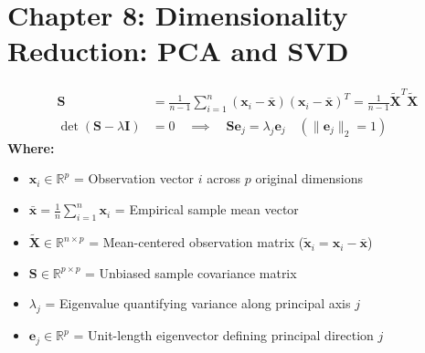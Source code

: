 \section*{Chapter 8: Dimensionality Reduction: PCA and SVD}

\begin{formulabox}
\begin{align*}
    \mathbf{S} &= \frac{1}{n - 1} \sum_{i=1}^n (\mathbf{x}_i - \bar{\mathbf{x}})(\mathbf{x}_i - \bar{\mathbf{x}})^T = \frac{1}{n - 1} \tilde{\mathbf{X}}^T \tilde{\mathbf{X}} \\[3pt]
    \det(\mathbf{S} - \lambda \mathbf{I}) &= 0 \quad \implies \quad \mathbf{S} \mathbf{e}_j = \lambda_j \mathbf{e}_j \quad (\|\mathbf{e}_j\|_2 = 1)
\end{align*}
\textbf{Where:}
\begin{itemize}[noitemsep, topsep=1pt]
    \item $\mathbf{x}_i \in \mathbb{R}^p$ = Observation vector $i$ across $p$ original dimensions
    \item $\bar{\mathbf{x}} = \frac{1}{n}\sum_{i=1}^n \mathbf{x}_i$ = Empirical sample mean vector
    \item $\tilde{\mathbf{X}} \in \mathbb{R}^{n \times p}$ = Mean-centered observation matrix ($\tilde{\mathbf{x}}_i = \mathbf{x}_i - \bar{\mathbf{x}}$)
    \item $\mathbf{S} \in \mathbb{R}^{p \times p}$ = Unbiased sample covariance matrix
    \item $\lambda_j$ = Eigenvalue quantifying variance along principal axis $j$
    \item $\mathbf{e}_j \in \mathbb{R}^p$ = Unit-length eigenvector defining principal direction $j$
\end{itemize}
\end{formulabox}

